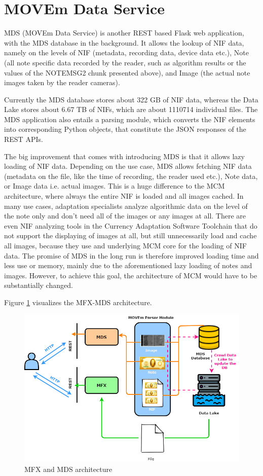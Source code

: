 \section{MOVEm Data Service}
MDS (MOVEm Data Service) is another REST based Flask web application, with the MDS database in the background. It allows the lookup of NIF data, namely on the levels of NIF (metadata, recording data, device data etc.), Note (all note specific data recorded by the reader, such as algorithm results or the values of the NOTEMSG2 chunk presented above), and Image (the actual note images taken by the reader cameras).\par Currently the MDS database stores about 322 GB of NIF data, whereas the Data Lake stores about 6.67 TB of NIFs, which are about 1110714 individual files. The MDS application also entails a parsing module, which converts the NIF elements into corresponding Python objects, that constitute the JSON responses of the REST APIs. \par The big improvement that comes with introducing MDS is that it allows lazy loading of NIF data. Depending on the use case, MDS allows fetching NIF data (metadata on the file, like the time of recording, the reader used etc.), Note data, or Image data i.e. actual images. This is a huge difference to the MCM architecture, where always the entire NIF is loaded and all images cached. In many use cases, adaptation specialists analyze algorithmic data on the level of the note only and don't need all of the images or any images at all. There are even NIF analyzing tools in the Currency Adaptation Software Toolchain that do not support the displaying of images at all, but still unnecessarily load and cache all images, because they use and underlying MCM core for the loading of NIF data. The promise of MDS in the long run is therefore improved loading time and less use or memory, mainly due to the aforementioned lazy loading of notes and images.
However, to achieve this goal, the architecture of MCM would have to be substantially changed.\par Figure \ref{fig:mds_overview} visualizes the MFX-MDS architecture.
\begin{figure}[ht!]
\includegraphics[width=1.0\textwidth]{images/MFX_MDS.png}
  \caption{MFX and MDS architecture}\label{fig:mds_overview}
\end{figure}

